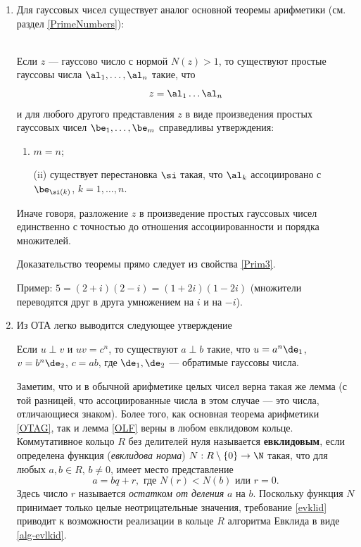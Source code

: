 \begin{enumerate}
\item Для гауссовых чисел существует аналог основной теоремы арифметики (см. раздел \ref{PrimeNumbers}):
\begin{thrm}\label{OTAG}\quad\\
Если $z$ --- гауссово число с нормой $N(z)>1$, то существуют простые гауссовы числа $\al_1,\dots,\al_n$ такие, что
$$
z=\al_1\dots\al_n
$$
и для любого другого представления $z$ в виде произведения простых гауссовых чисел $\be_1,\dots,\be_m$  справедливы утверждения:
\begin{enumerate}[\textup{(i)}]
\item $m=n$;
\item[\textup{(ii)}] существует перестановка $\si$ такая, что $\al_k$ ассоциировано с $\be_{\si(k)}$, $k=1,\dots,n$.
\end{enumerate}

Иначе говоря, разложение $z$ в произведение простых гауссовых чисел единственно с точностью до отношения ассоциированности и порядка множителей.
\end{thrm}
Доказательство теоремы прямо следует из свойства \ref{Prim3}.

Пример: $5=(2+i)(2-i)=(1+2i)(1-2i)$ (множители переводятся друг в друга умножением на $i$ и на $-i$).





\item Из ОТА легко выводится следующее утверждение
\begin{lem}\label{OLF}
Если $u\perp v$ и $uv=c^n$, то существуют $a\perp b$ такие, что $u=a^n\de_1$, $v=b^n\de_2$, $c=ab$, где $\de_1,\de_2$ --- обратимые гауссовы числа.
\end{lem}

Заметим, что и в обычной арифметике целых чисел верна такая же лемма (с той разницей, что ассоциированные числа в этом случае --- это числа, отличающиеся знаком). Более того, как основная теорема арифметики \ref{OTAG}, так и лемма \ref{OLF} верны в любом евклидовом кольце. Коммутативное кольцо $R$ без делителей нуля называется \textbf{евклидовым}, если определена функция (\textit{евклидова норма}) $N:R\setminus\{0\}\to\N$ такая, что для любых $a,b\in R$, $b\ne 0$, имеет место представление 
\begin{equation}\label{evklid}
a=bq+r, \mbox{ где } N(r)<N(b)\mbox{ или }r=0.
\end{equation}
Здесь число $r$ называется \textit{остатком от деления} $a$ на $b$. Поскольку функция $N$ принимает только целые неотрицательные значения, требование \eqref{evklid} приводит к возможности реализации в кольце $R$ алгоритма Евклида  в виде \eqref{alg-evlkid}.


\end{enumerate}
